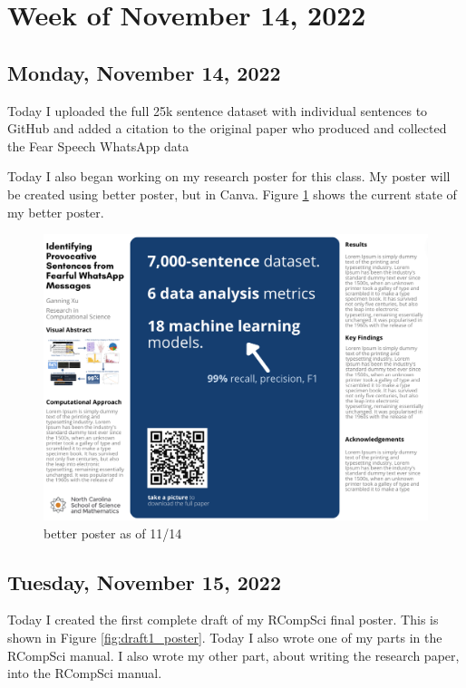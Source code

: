 \documentclass[11pt,letterpaper]{article}
\begin{document}
\section{Week of November 14, 2022}
\subsection{Monday, November 14, 2022}
Today I uploaded the full 25k sentence dataset with individual sentences to GitHub and added a citation to the original paper who produced and collected the Fear Speech WhatsApp data

Today I also began working on my research poster for this class. My poster will be created using better poster, but in Canva. Figure \ref{fig:better} shows the current state of my better poster.

\begin{figure}[!hbt]
    \centering
    \includegraphics[scale=0.4]{images/better.png}
    \caption{better poster as of 11/14}
    \label{fig:better}
\end{figure}

\subsection{Tuesday, November 15, 2022}
Today I created the first complete draft of my RCompSci final poster. This is shown in Figure \ref{fig:draft1_poster}. Today I also wrote one of my parts in the RCompSci manual. I also wrote my other part, about writing the research paper, into the RCompSci manual.
\end{document}
